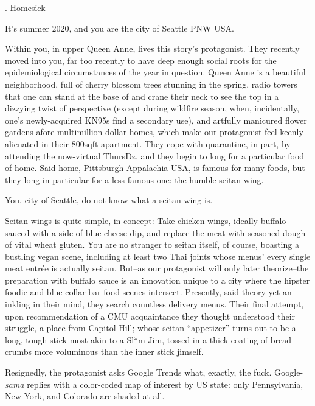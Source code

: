 \documentclass[12pt]{article}
\newcommand\chapter[2]{{\thispagestyle{empty} \Large \sc #1. \quad #2

\vspace{1.5em}}}
\begin{document}
\chapter{1}{Homesick}

It's summer 2020, and you are the city of Seattle PNW USA.

Within you, in upper Queen Anne, lives this story's protagonist.
They recently moved into you, far too recently to have deep enough social roots for the epidemiological circumstances of the year in question.
Queen Anne is a beautiful neighborhood,
full of cherry blossom trees stunning in the spring,
radio towers that one can stand at the base of and crane their neck to see the top in a dizzying twist of perspective
(except during wildfire season, when, incidentally, one's newly-acquired KN95s find a secondary use),
and artfully manicured flower gardens afore multimillion-dollar homes,
which make our protagonist feel keenly alienated in their 800sqft apartment.
They cope with quarantine, in part, by attending the now-virtual ThursDz,
and they begin to long for a particular food of home.
%
Said home, Pittsburgh Appalachia USA, is famous for many foods,
but they long in particular for a less famous one: the humble seitan wing.

You, city of Seattle, do not know what a seitan wing is.

Seitan wings is quite simple, in concept: Take chicken wings, ideally buffalo-sauced with a side of blue cheese dip, and replace the meat with seasoned dough of vital wheat gluten.
You are no stranger to seitan itself, of course, boasting a bustling vegan scene, including at least two Thai joints whose menus' every single meat entr\'ee is actually seitan.
But--as our protagonist will only later theorize--the preparation with buffalo sauce is an innovation unique to a city where the hipster foodie and blue-collar bar food scenes intersect.
Presently, said theory yet an inkling in their mind, they search countless delivery menus.
Their final attempt, upon recommendation of a CMU acquaintance they thought understood their struggle, a place from Capitol Hill;
whose seitan ``appetizer'' turns out to be a long, tough stick most akin to a Sl*m Jim, tossed in a thick coating of bread crumbs more voluminous than the inner stick jimself.

Resignedly, the protagonist asks Google Trends what, exactly, the fuck. Google-{\em sama} replies with a color-coded map of interest by US state: only Pennsylvania, New York, and Colorado are shaded at all.
\end{document}
